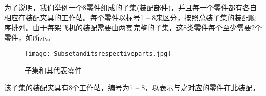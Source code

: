 为了说明，我们举例一个8零件组成的子集(装配部件)，并且每一个零件都有各自相应在装配夹具的工作站。每个零件以标号1 -- 8来区分，按照总装子集的装配顺序排列。由于每架飞机的装配需要由两套完整的子集，这8类零件每个至少需要2个零件，如所示。
\begin{figure}[h]
\centering\caption{子集和其代表零件\label{fig:subsetandparts}}
\texttt{[image: Subsetanditsrespectiveparts.jpg]}
\end{figure}

该子集的装配夹具有8个工作站，编号为1 -- 8，以表示与之对应的零件在此装配。
